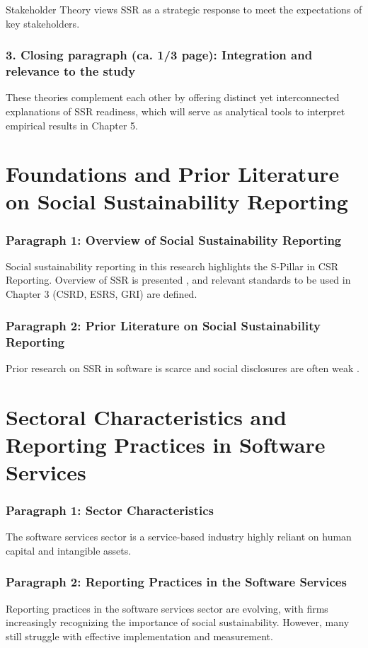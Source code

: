 Stakeholder Theory \parencite{Freeman1984} views SSR as a strategic response to meet the expectations of key stakeholders.

\subsubsection{3. Closing paragraph (ca. 1/3 page): Integration and relevance to the study}

These theories complement each other by offering distinct yet interconnected explanations of SSR readiness, 
which will serve as analytical tools to interpret empirical results in Chapter 5.

\section{Foundations and Prior Literature on Social Sustainability Reporting}

\subsubsection{Paragraph 1: Overview of Social Sustainability Reporting}
Social sustainability reporting in this research highlights the S-Pillar in CSR Reporting.
Overview of SSR is presented \parencite{Edge2022,Fiechter2022}, and relevant standards \parencite{Dechow2023} to be 
used in Chapter 3 (CSRD, ESRS, GRI) are defined.

\subsubsection{Paragraph 2: Prior Literature on Social Sustainability Reporting}
Prior research on SSR in software is scarce \parencite{Ye2020,Afshari2022} and 
social disclosures are often weak \parencite{Christensen2021,Reitmaier2024}.


\section{Sectoral Characteristics and Reporting Practices in Software Services}

\subsubsection{Paragraph 1: Sector Characteristics}
The software services sector is a service-based industry highly reliant on human capital and intangible assets.

\subsubsection{Paragraph 2: Reporting Practices in the Software Services}
Reporting practices in the software services sector are evolving, with firms increasingly recognizing 
the importance of social sustainability. However, many still struggle with effective implementation and measurement.

